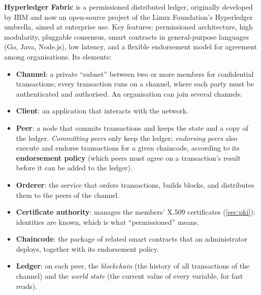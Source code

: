 \textbf{Hyperledger Fabric} is a permissioned distributed ledger, originally developed by IBM and now an open-source project of the Linux Foundation's Hyperledger umbrella, aimed at enterprise use. Key features: permissioned architecture, high modularity, pluggable consensus, smart contracts in general-purpose languages (Go, Java, Node.js), low latency, and a flexible endorsement model for agreement among organisations. Its elements:
\begin{itemize}
    \item \textbf{Channel}: a private \enquote{subnet} between two or more members for confidential transactions; every transaction runs on a channel, where each party must be authenticated and authorised. An organisation can join several channels.
    \item \textbf{Client}: an application that interacts with the network.
    \item \textbf{Peer}: a node that commits transactions and keeps the state and a copy of the ledger. \emph{Committing peers} only keep the ledger; \emph{endorsing peers} also execute and endorse transactions for a given chaincode, according to its \textbf{endorsement policy} (which peers must agree on a transaction's result before it can be added to the ledger).
    \item \textbf{Orderer}: the service that orders transactions, builds blocks, and distributes them to the peers of the channel.
    \item \textbf{Certificate authority}: manages the members' X.509 certificates (\cref{sec:pki}): identities are known, which is what \enquote{permissioned} means.
    \item \textbf{Chaincode}: the package of related smart contracts that an administrator deploys, together with its endorsement policy.
    \item \textbf{Ledger}: on each peer, the \emph{blockchain} (the history of all transactions of the channel) and the \emph{world state} (the current value of every variable, for fast reads).
\end{itemize}

